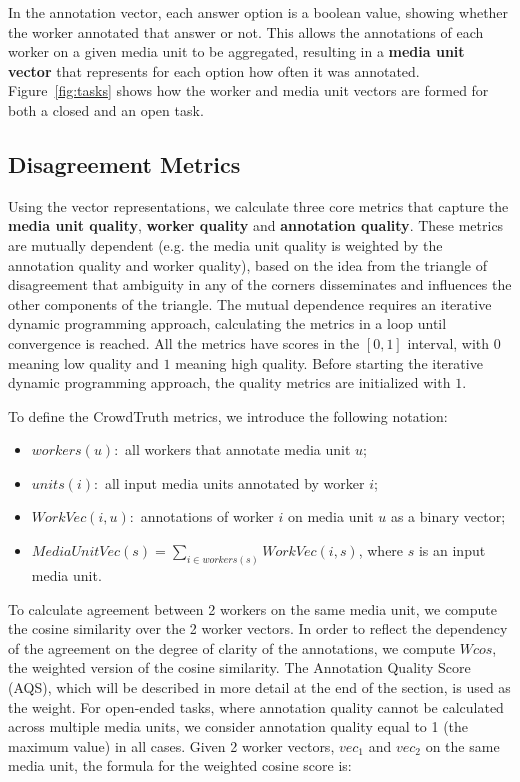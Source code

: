 In the annotation vector, each answer option is a boolean value, showing whether the worker annotated that answer or not. This allows the annotations of each worker on a given media unit to be aggregated, resulting in a \textbf{media unit vector} that represents for each option how often it was annotated. Figure~\ref{fig:tasks} shows how the worker and media unit vectors are formed for both a closed and an open task.

\subsection{Disagreement Metrics}
\label{sec:metrics}

Using the vector representations, we calculate three core metrics that capture the \textbf{media unit quality}, \textbf{worker quality} and \textbf{annotation quality}. These metrics are mutually dependent (e.g. the media unit quality is weighted by the annotation quality and worker quality), based on the idea from the triangle of disagreement that ambiguity in any of the corners disseminates and influences the other components of the triangle. The mutual dependence requires an iterative dynamic programming approach, calculating the metrics in a loop until convergence is reached. All the metrics have scores in the $[0,1]$ interval, with $0$ meaning low quality and $1$ meaning high quality. Before starting the iterative dynamic programming approach, the quality metrics are initialized with $1$. %

To define the CrowdTruth metrics, we introduce the following notation:
\begin{itemize}
\item $workers(u):$ all workers that annotate media unit $u$;
\item $units(i):$ all input media units annotated by worker $i$;
\item $WorkVec(i, u):$ annotations of worker $i$ on media unit $u$ as a binary vector;
\item $MediaUnitVec(s) = \sum_{i \in workers(s)} WorkVec(i,s)$, where $s$ is an input media unit.
\end{itemize}

To calculate agreement between 2 workers on the same media unit, we compute the cosine similarity over the 2 worker vectors. In order to reflect the dependency of the agreement on the degree of clarity of the annotations, we compute $Wcos$, the weighted version of the cosine similarity. The Annotation Quality Score (AQS), which will be described in more detail at the end of the section, is used as the weight. For open-ended tasks, where annotation quality cannot be calculated across multiple media units, we consider annotation quality equal to 1 (the maximum value) in all cases. Given 2 worker vectors, $vec_1$ and $vec_2$ on the same media unit, the formula for the weighted cosine score is:

